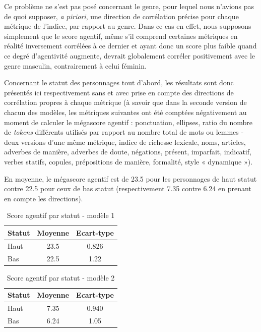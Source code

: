 Ce problème ne s’est pas posé concernant le genre, pour lequel nous n’avions pas de quoi supposer, \textit{a piriori}, une direction de corrélation précise pour chaque métrique de l’indice, par rapport au genre. Dans ce cas en effet, nous supposons simplement que le score agentif, même s'il comprend certaines métriques en réalité inversement corrélées à ce dernier et ayant donc un score plus faible quand ce degré d'agentivité augmente, devrait globalement corréler positivement avec le genre masculin, contrairement à celui féminin.

Concernant le statut des personnages tout d’abord, les résultats sont donc présentés ici respectivement sans et avec prise en compte des directions de corrélation propres à chaque métrique (à savoir que dans la seconde version de chacun des modèles, les métriques suivantes ont été comptées négativement au moment de calculer le mégascore agentif : ponctuation, ellipses, ratio du nombre de \textit{tokens} différents utilisés par rapport au nombre total de mots ou lemmes - deux versions d'une même métrique, indice de richesse lexicale, noms, articles, adverbes de manière, adverbes de doute, négations, présent, imparfait, indicatif, verbes statifs, copules, prépositions de manière, formalité, style  « dynamique »).

En moyenne, le mégascore agentif est de 23.5 pour les personnages de haut statut contre 22.5 pour ceux de bas statut (respectivement 7.35 contre 6.24 en prenant en compte les directions).

\begin{table}[ht]
\caption{Score agentif par statut - modèle 1}
\centering
\bigskip
\begin{tabular}{lS[table-format=2.1]S[table-format=1.3]}
    \hline
    Statut &  Moyenne & Ecart-type \\
    \hline
    Haut &  23.5 & 0.826 \\
    Bas &  22.5 & 1.22 \\
    \hline
\end{tabular}
 \label{Tab:moystatut}
\end{table}
\bigskip

\begin{table}[ht]
\caption{Score agentif par statut - modèle 2}
\centering
\bigskip
\begin{tabular}{lS[table-format=2.1]S[table-format=1.3]}
    \hline
    Statut &  Moyenne & Ecart-type \\
    \hline
    Haut &  7.35 & 0.940 \\
    Bas &  6.24 & 1.05 \\
    \hline
\end{tabular}
 \label{Tab:moy_statut}
\end{table}
\bigskip

